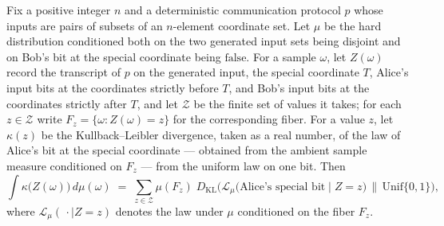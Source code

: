 \begin{theorem}
\label{CommunicationComplexity.Functions.Disjointness.RandomizedLowerBound.integral_xFiberKL_disjointSpecialYFalse_eq_sum_zVariable_klDiv}
\leanok
{}
Fix a positive integer $n$ and a deterministic communication protocol $p$ whose inputs
are pairs of subsets of an $n$-element coordinate set. Let $\mu$ be the hard
distribution conditioned both on the two generated input sets being disjoint and on
Bob's bit at the special coordinate being $\mathrm{false}$. For a sample $\omega$, let
$Z(\omega)$ record the transcript of $p$ on the generated input, the special coordinate
$T$, Alice's input bits at the coordinates strictly before $T$, and Bob's input bits at
the coordinates strictly after $T$, and let $\mathcal Z$ be the finite set of values it
takes; for each $z \in \mathcal Z$ write $F_z = \{\omega : Z(\omega) = z\}$ for the
corresponding fiber. For a value $z$, let $\kappa(z)$ be the Kullback–Leibler
divergence, taken as a real number, of the law of Alice's bit at the special coordinate
— obtained from the ambient sample measure conditioned on $F_z$ — from the uniform law
on one bit. Then
\[ \int \kappa\big(Z(\omega)\big)\, d\mu(\omega) \;=\; \sum_{z \in \mathcal Z} \mu(F_z)\; D_{\mathrm{KL}}\!\Big( \mathcal L_\mu\big(\text{Alice's special bit} \mid Z = z\big) \,\Big\|\, \mathrm{Unif}\{0,1\} \Big), \]
where $\mathcal L_\mu(\,\cdot \mid Z = z)$ denotes the law under $\mu$ conditioned on
the fiber $F_z$.
\end{theorem}

